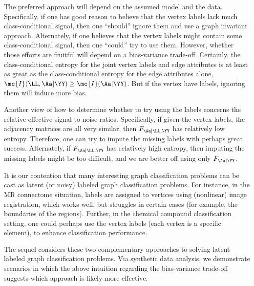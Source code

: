 \documentclass[10pt,journal,cspaper,compsoc]{IEEEtran}
\begin{document}
The preferred approach will depend on the assumed model and the data.  Specifically, if one has good reason to believe that the vertex labels lack much class-conditional signal, then one ``should'' ignore them and use a graph invariant approach.  Alternately, if one believes that the vertex labels might contain some class-conditional signal, then one ``could'' try to use them.  However, whether those efforts are fruitful will depend on a bias-variance trade-off.  Certainly, the class-conditional entropy for the joint vertex labels and edge attributes is at least as great as the class-conditional entropy for the edge attributes alone, $\mc{I}(\LL,\Aa | \YY) \geq \mc{I}(\Aa | \YY)$.   But if the vertex have labels, ignoring them will induce more bias.  

Another view of how to determine whether to try using the labels concerns the relative effective signal-to-noise-ratios.  Specifically, if given the vertex labels, the adjacency matrices are all very similar, then $F_{\Aa | \LL, \YY}$ has relatively low entropy.  Therefore, one can try to impute the missing labels with perhaps great success.  Alternately, if $F_{\Aa | \LL, \YY}$ has relatively high entropy, then imputing the missing labels might be too difficult, and we are better off using only $F_{\Aa | \YY}$.

It is our contention that many interesting graph classification problems can be cast as latent (or noisy) labeled graph classification problems.  For instance, in the MR connectome situation, labels are assigned to vertices using (nonlinear) image registration, which works well, but struggles in certain cases (for example, the boundaries of the regions).  Further, in the chemical compound classification setting, one could perhaps use the vertex labels (each vertex is a specific element), to enhance classification performance.  

The sequel considers these two complementary approaches to solving latent labeled graph classification problems. Via synthetic data analysis, we demonstrate scenarios in which the above intuition regarding the bias-variance trade-off suggests which approach is likely more effective.


\end{document}
